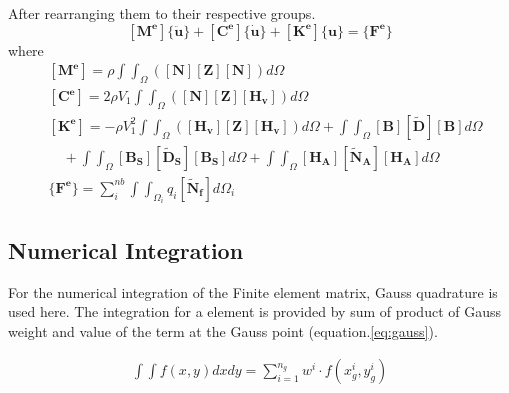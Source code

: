 \documentclass[main.tex]{subfiles}
\begin{document}
After rearranging them to their respective groups.
\begin{equation*}
\left[ \mathbf{M^e}  \right] 
\{ \ddot{\mathbf{u}} \}
+
\left[ \mathbf{C^e}  \right] 
\{ \dot{\mathbf{u}} \}
+
\left[ \mathbf{K^e}  \right] 
\{\mathbf{u} \}
=
\{ \mathbf{F^e} \}
\end{equation*}
where 
\begin{align*}
&\left[ \mathbf{M^e}  \right]  
= \rho
\int \int_\Omega 
\left(
\left[ \mathbf{N}  \right]
\left[ \mathbf{Z}  \right]
\left[ \mathbf{N}  \right] 
\right)  d \Omega  \\
&\left[ \mathbf{C^e}  \right]   
= 2 \rho V_1
\int \int_\Omega 
\left( 
\left[ \mathbf{N}  \right]
\left[ \mathbf{Z}  \right]
\left[ \mathbf{H_v}  \right] 
\right)  d \Omega  \\ &
\left[ \mathbf{K^e}  \right] 
=  - \rho V_1^2
\int \int_\Omega 
\left( 
\left[ \mathbf{H_v}  \right]
\left[ \mathbf{Z}  \right]
\left[ \mathbf{H_v}  \right] 
\right)  d \Omega + 
\int \int_\Omega  
\left[ \mathbf{B}  \right]
\left[ \mathbf{\tilde{D}}  \right]
\left[ \mathbf{B}  \right]  
  d \Omega   \\  &  \quad +
  \int \int_\Omega  
\left[ \mathbf{B_S}  \right]
\left[ \mathbf{\tilde{D}_S}  \right]
\left[ \mathbf{B_S}  \right] 
  d \Omega +
  \int \int_\Omega  
\left[ \mathbf{H_A}  \right]
\left[ \mathbf{\tilde{N}_A}  \right]
\left[ \mathbf{H_A}  \right]  
  d \Omega  \\ &
\{ \mathbf{F^e} \}  = 
 \sum_i^{nb}   \int  \int_{\Omega_i}   
 q_i 
\left[ \mathbf{\tilde{N}_f}  \right] 
  d \Omega_i    
\end{align*}





\subsection{Numerical Integration}
For the numerical integration of the Finite element matrix, Gauss quadrature is used here. The integration for a element is provided by sum of product of Gauss weight and value of the term at the Gauss point (equation.\ref{eq:gauss}). 


\begin{equation} \label{eq:gauss}
\begin{split}
\int \int f(x,y) dx dy = 
 \sum_{i = 1}^{n_g}  w^i  \cdot f(x_g^i,y_g^i) 
\end{split}
\end{equation}
\end{document}
